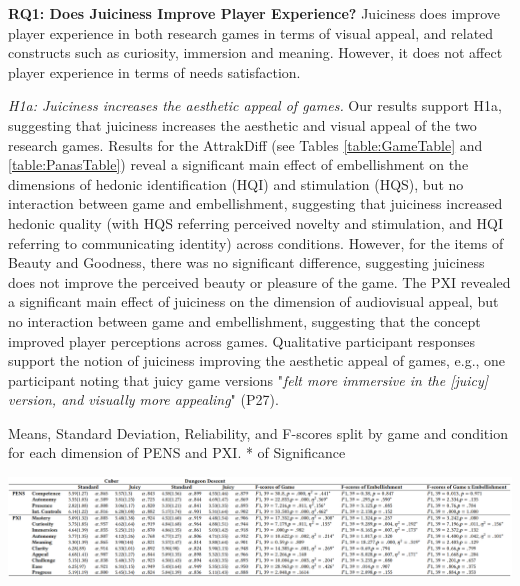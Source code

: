 \documentclass{sigchi}
\begin{document}
\textbf{RQ1: Does Juiciness Improve Player Experience?}
Juiciness does improve player experience in both research games in terms of visual appeal, and related constructs such as curiosity, immersion and meaning. However, it does not affect player experience in terms of needs satisfaction.

\textit{H1a: Juiciness increases the aesthetic appeal of games.} Our results support H1a, suggesting that juiciness increases the aesthetic and visual appeal of the two research games. Results for the AttrakDiff (see Tables \ref{table:GameTable} and \ref{table:PanasTable}) reveal a significant main effect of embellishment on the dimensions of hedonic identification (HQI) and stimulation (HQS), but no interaction between game and embellishment, suggesting that juiciness increased hedonic quality (with HQS referring perceived novelty and stimulation, and HQI referring to communicating identity) across conditions. However, for the items of Beauty and Goodness, there was no significant difference, suggesting juiciness does not improve the perceived beauty or pleasure of the game. The PXI revealed a significant main effect of juiciness on the dimension of audiovisual appeal, but no interaction between game and embellishment, suggesting that the concept improved player perceptions across games. Qualitative participant responses support the notion of juiciness improving the aesthetic appeal of games, e.g.,  one participant noting that juicy game versions "\textit{felt more immersive in the [juicy] version, and visually more appealing}" (P27).
\begin{table}
  \caption{Means, Standard Deviation, Reliability, and F-scores split by game and condition for each dimension of PENS and PXI. * of Significance}
  \label{table:GameTable}
   \includegraphics[width=\textwidth]{figures/Game_Exp_Table}
\end{table}
\end{document}

